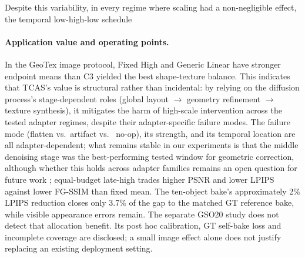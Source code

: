 \documentclass[times,twocolumn,final]{elsarticle}
\providecommand{\DIFadd}[1]{{\protect\color{blue} \sf #1}} %
\providecommand{\DIFdel}[1]{{\protect\color{red} \scriptsize #1}} %
\providecommand{\DIFaddbegin}{} %
\providecommand{\DIFaddend}{} %
\providecommand{\DIFdelbegin}{} %
\providecommand{\DIFdelend}{} %
\begin{document}
\DIFdelbegin \DIFdel{Despite this variability, in every regime where scaling had a non-negligible effect, the temporal low-high-low schedule }\DIFdelend \DIFaddbegin \paragraph{Application value and operating points.}
\DIFadd{In the GeoTex image protocol, Fixed High and Generic Linear have stronger endpoint means than }\DIFaddend C3\DIFdelbegin \DIFdel{yielded the best shape-texture balance. This indicates that TCAS's value is structural rather than incidental: by relying on the diffusion process's stage-dependent roles (global layout $\to$ geometry refinement $\to$ texture synthesis), it mitigates the harm of high-scale intervention across the tested adapter regimes, despite their adapter-specific failure modes. The failure mode (flatten vs.\ artifact vs. \ no-op), its strength, and its temporal location are all adapter-dependent; what remains stable in our experiments is that the middle denoising stage was the best-performing tested window for geometric correction, although whether this holds across adapter families remains an open question for future work}\DIFdelend \DIFaddbegin \DIFadd{; equal-budget late-high trades higher PSNR and lower LPIPS against lower FG-SSIM than fixed mean. The ten-object bake's approximately 2\% LPIPS reduction closes only 3.7\% of the gap to the matched GT reference bake, while visible appearance errors remain. The separate GSO20 study does not detect that allocation benefit. Its post hoc calibration, GT self-bake loss and incomplete coverage are disclosed; a small image effect alone does not justify replacing an existing deployment setting}\DIFaddend .
\end{document}
